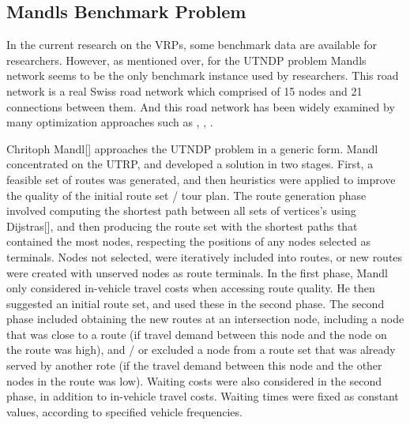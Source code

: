 \subsection{Mandls Benchmark Problem}
In the current research on the VRPs, some benchmark data are available for researchers. However, as mentioned over, for the UTNDP problem Mandls network seems to be the only benchmark instance used by researchers. This road network is a real Swiss road network which comprised of 15 nodes and 21 connections between them. And this road network has been widely examined by many optimization approaches such as \citep{kechagiopoulos14}, \citep{fan09}, \citep{nikolic14}.

Chritoph Mandl[] approaches the UTNDP problem in a generic form. Mandl concentrated on the UTRP, and developed a solution in two stages. First, a feasible set of routes was generated, and then heuristics were applied to improve the quality of the initial route set / tour plan. The route generation phase involved computing the shortest path between all sets of vertices's using Dijstras[], and then producing the route set with the shortest paths that contained the most nodes, respecting the positions of any nodes selected as terminals. Nodes not selected, were iteratively included into routes, or new routes were created with unserved nodes as route terminals. In the first phase, Mandl only considered in-vehicle travel costs when accessing route quality. He then suggested an initial route set, and used these in the second phase. The second phase included obtaining the new routes at an intersection node, including a node that was close to a route (if travel demand between this node and the node on the route was high), and / or excluded a node from a route set that was already served by another rote (if the travel demand between this node and the other nodes in the route was low). Waiting costs were also considered in the second phase, in addition to in-vehicle travel costs. Waiting times were fixed as constant values, according to specified vehicle frequencies. 

